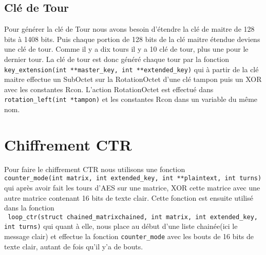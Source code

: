 \documentclass[french, 12pt]{article}
\begin{document}
	\subsection{Clé de Tour}
	Pour générer la clé de Tour nous avons besoin d'étendre la clé de maitre de 128 bits à 1408 bits. Puis chaque portion de 128 bits de la clé maitre étendue deviens une clé de tour. Comme il y a dix tours il y a 10 clé de tour, plus une pour le dernier tour. La clé de tour est donc généré chaque tour par la fonction \verb|key_extension(int **master_key, int **extended_key)| qui à partir de la clé maitre effectue un SubOctet sur la RotationOctet d'une clé tampon puis un XOR avec les constantes Rcon. L'action RotationOctet est effectué dans \verb|rotation_left(int *tampon)| et les constantes Rcon dans un variable du même nom.
	
	\section{Chiffrement CTR}
	
	Pour faire le chiffrement CTR nous utilisons une fonction\\ \verb|counter_mode(int matrix, int extended_key, int **plaintext, int turns)| qui après avoir fait les tours d'AES sur une matrice, XOR cette matrice avec une autre matrice contenant 16 bits de texte clair. Cette fonction est ensuite utilisé dans la fonction \\
	\verb| loop_ctr(struct chained_matrixchained, int matrix, int extended_key,| \verb|int turns)| qui quant à elle, nous place au début d'une liste chainée(ici le message clair) et effectue la fonction \verb|counter_mode| avec les bouts de 16 bits de texte clair, autant de fois qu'il y'a de bouts.
	
\end{document}

